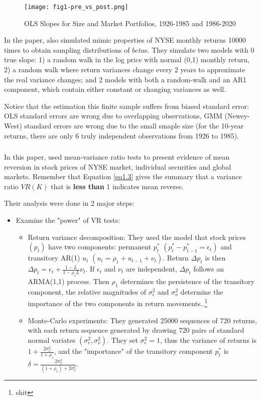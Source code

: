\begin{figure}[ht]
    \texttt{[image: fig1-pre\_vs\_post.png]}
    \centering
    \caption{OLS Slopes for Size and Market Portfolios, 1926-1985 and 1986-2020}\label{fig1-pre_vs_post}
\end{figure}

In the paper, \citeauthor{fama1988permanent} also simulated mimic properties of NYSE monthly returns 10000 times to obtain sampling distributions of $beta$s. They simulate two models with 0 true slope: 1) a random walk in the log price with normal (0,1) monthly return,
2) a random walk where return variances change every 2 years to approximate the real variance changes; and 2 models with both a random-walk and an AR1 component, which contain either constant or changing variances as well.

Notice that the estimation this finite sample suffers from biased standard error: OLS standard errors are wrong due to overlapping observations, GMM (Newey-West) standard errors are wrong due to the small smaple size (for the 10-year returns, there are only 6 truly independent observations from 1926 to 1985).

\subsubsection{\citet{poterba1988mean}}\label{chap1:sec2:ssec1:paper2}
In this paper, \citeauthor{poterba1988mean} used mean-variance ratio tests to present evidence of mean reversion in stock prices of NYSE market, individual securities and global markets. Remember that Equation \ref{eq1.3} gives the summary that a variance ratio $VR(K)$ that is \textbf{less than} 1 indicates mean reverse. 

Their analysis were done in 2 major steps:
\begin{itemize}
    \item Examine the "power" of VR tests: 
    \begin{itemize}
        \item Return variance decomposition: They used the model that stock prices $(p_t)$ have two components: permanent $p_t^*$ $(p_t^*-p_{t-1}^*=\epsilon_t)$ and transitory AR(1) $u_t$ $(u_t=\rho_1+u_{t-1}+\nu_t)$. Return $\Delta p_t$ is then $\Delta p_t = \epsilon_t + \frac{1-L}{1-\rho_1 L}\nu_t$. If $\epsilon_t$ and $\nu_t$ are independent, $\Delta p_t$ follows an ARMA(1,1) process. Then $\rho_1$ determines the persistence of the transitory component, the relative magnitudes of $\sigma^2_{\epsilon}$ and $\sigma^2_{\nu}$ determine the importance of the two components in return movements..\footnote{shit}
        \item Monte-Carlo experiments: They generated 25000 sequences of 720 returns, with each return sequence generated by drawing 720 pairs of standard normal variates $(\sigma^2_{\epsilon},\sigma^2_{\nu})$. They set $\sigma^2_{\epsilon}=1$, thus the variance of returns is $1+\frac{2\sigma^2_{\nu}}{1+\rho_1}$, and the "importance" of the transitory component $p^*_t$ is $\delta = \frac{2\sigma^2_{\nu}}{(1+\rho_1)+2\sigma^2_{\nu}}$.
    \end{itemize}
\end{itemize}

